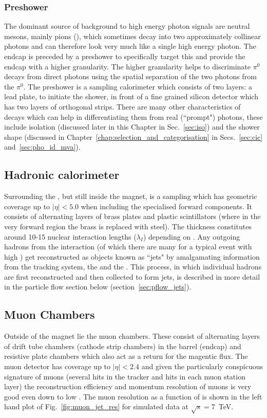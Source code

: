 \subsubsection{Preshower}
The dominant source of background to high energy photon signals are neutral mesons, mainly pions (\pizero), which sometimes decay into two approximately collinear photons and can therefore look very much like a single high energy photon. The \ECAL endcap is preceded by a preshower to specifically target this and provide the endcap with a higher granularity. The higher granularity helps to discriminate $\pi^{0}$ decays from direct photons using the spatial separation of the two photons from the $\pi^{0}$. The preshower is a sampling calorimeter which consists of two layers: a lead plate, to initiate the shower, in front of a fine grained silicon detector which has two layers of orthogonal strips. There are many other characteristics of \pizero decays which can help in differentiating them from real (``prompt") photons, these include isolation (discussed later in this Chapter in Sec.~\ref{sec:iso}) and the shower shape (discussed in Chapter~\ref{chap:selection_and_categorisation} in Secs.~\ref{sec:cic} and~\ref{sec:pho_id_mva}).

\subsection{Hadronic calorimeter}
\label{sec:hcal}

Surrounding the \ECAL, but still inside the magnet, is a sampling \HCAL which has geometric coverage up to $|\eta|<5.0$ when including the specialised forward components. It consists of alternating layers of brass plates and plastic scintillators (where in the very forward region the brass is replaced with steel). The \HCAL thickness constitutes around 10-15 nuclear interaction lengths ($\lambda_{I}$) depending on \eta. Any outgoing hadrons from the interaction (of which there are many for a typical event with high \ET) get reconstructed as objects known as ``jets" by amalgamating information from the tracking system, the \ECAL and the \HCAL. This process, in which individual hadrons are first reconstructed and then collected to form jets, is described in more detail in the particle flow section below (section~\ref{sec:pflow_jets}).  

\subsection{Muon Chambers}
\label{sec:muons}
Outside of the magnet lie the \CMS muon chambers. These consist of alternating layers of drift tube chambers (cathode strip chambers) in the barrel (endcap) and resistive plate chambers which also act as a return for the magentic flux. The muon detector has coverage up to $|\eta|<2.4$ and given the particularly conspicuous signature of muons (several hits in the tracker and hits in each muon station layer) the reconstruction efficiency and momentum resolution of muons is very good even down to low \pT. The muon resolution as a function of \pT is shown in the left hand plot of Fig.~\ref{fig:muon_jet_res} for simulated data at $\sqrt{s}=7$~TeV.

